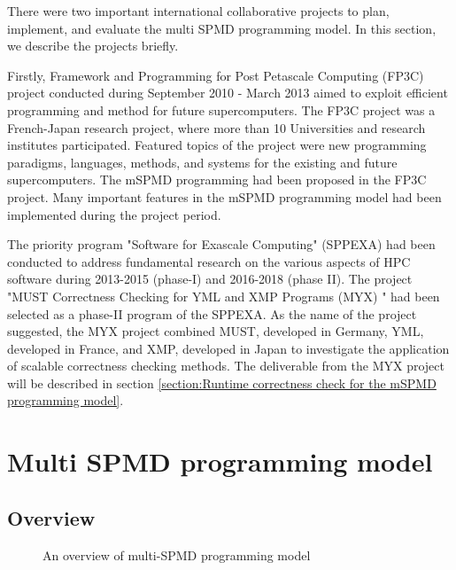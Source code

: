 \documentclass[graybox]{svmult}
\begin{document}
There were two important international collaborative projects to plan, implement, and evaluate the multi SPMD programming model. In this section, we describe the projects briefly.

Firstly,  Framework and Programming for Post Petascale Computing (FP3C)  project conducted during September 2010 - March 2013 aimed to exploit efficient programming and method for future supercomputers. The FP3C project was a French-Japan research project, where more than 10 Universities and research institutes participated. Featured topics of the project were new programming paradigms, languages, methods, and systems for the existing and future supercomputers.   The mSPMD programming had been proposed in the FP3C project. Many important features in the mSPMD programming model had been implemented during the project period.

The priority program "Software for Exascale Computing" (SPPEXA) had been conducted to address fundamental research on the various aspects of HPC software during 2013-2015 (phase-I) and 2016-2018 (phase II). The project "MUST Correctness Checking for YML and XMP Programs (MYX) " had been selected as a phase-II program of the SPPEXA. As the name of the project suggested, the MYX project combined MUST, developed in Germany, YML, developed in France, and XMP, developed in Japan to investigate the application of scalable correctness checking methods.
The deliverable from the MYX project will be described in section \ref{section:Runtime correctness check for the mSPMD programming model}.

\section{Multi SPMD programming model}
\label{section:multi spmd programming model}

\subsection{Overview}

\begin{figure}[t]
 \begin{center}
\caption{An overview of multi-SPMD programming model}
\label{figure:overview of mSPMD}
 \end{center}
\end{figure}
\end{document}
